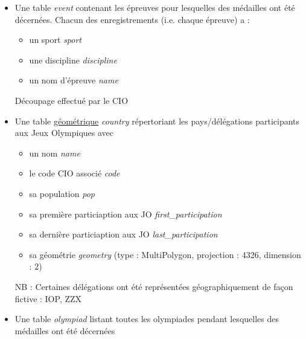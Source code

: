\documentclass{article}
\begin{document}
\begin{itemize}

\item
Une table \textit{event} contenant les épreuves pour lesquelles des médailles ont été décernées. Chacun des enregistrements (i.e. chaque épreuve) a :

\begin{itemize}

\item un sport \textit{sport}

\item une discipline \textit{discipline}

\item un nom d'épreuve \textit{name}

\end{itemize}

{\footnotesize Découpage effectué par le CIO}

\item
Une table \underline{géométrique} \textit{country} répertoriant les pays/délégations participants aux Jeux Olympiques avec  

\begin{itemize}

\item un nom \textit{name}

\item le code CIO associé \textit{code}

\item sa population \textit{pop}

\item sa première particiaption aux JO \textit{first\_participation}

\item sa dernière particiaption aux JO \textit{last\_participation}

\item sa géométrie \textit{geometry} {\footnotesize (type : MultiPolygon, projection : 4326, dimension : 2) }

\end{itemize}

{\footnotesize NB : Certaines délégations ont été représentées géographiquement de façon fictive : IOP, ZZX}

\item
Une table \textit{olympiad} listant toutes les olympiades pendant lesquelles des médailles ont été décernées

\begin{itemize}


\end{itemize}
\end{itemize}
\end{document}
